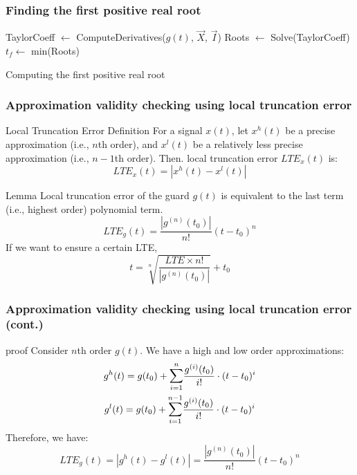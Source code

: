 \begin{frame}[c] \frametitle{ Finding the first positive real root }
	\begin{algorithm}[H]
	\SetAlgoLined
	TaylorCoeff $\leftarrow$ ComputeDerivatives($g(t)$, $\vec{X}$, $\vec{I}$)\;
	Roots $\leftarrow$ Solve(TaylorCoeff)\;
	$t_f \leftarrow $ min(Roots)\;
	\caption{Computing the first positive real root}
	\end{algorithm}
\end{frame}


\begin{frame}[c] \frametitle{ Approximation validity checking using local truncation error }
	\begin{block}{Local Truncation Error Definition}
		For a signal $x(t)$, let $x^h(t)$ be a precise approximation (i.e., $n$th order), and $x^l(t)$ be a relatively less precise approximation (i.e., $n-1$th order). Then. local truncation error $LTE_x(t)$ is:
		\begin{equation}
			LTE_x(t) = | x^h(t) - x^l(t) |
		\end{equation}
	\end{block}
	\begin{block}{Lemma}
		Local truncation error of the guard $g(t)$ is equivalent to the last term (i.e., highest order) polynomial term. 
		\begin{equation}
			LTE_g(t) = \dfrac{| g^{(n)}(t_0) |}{n!}(t-t_0)^n
		\end{equation}
		If we want to ensure a certain LTE,
		\begin{equation}
			t = \sqrt[n]{\dfrac{LTE \times n!}{ |g^{(n)}(t_0)|}} + t_0
		\end{equation}
	\end{block}
\end{frame}

\begin{frame}[c] \frametitle{ Approximation validity checking using local truncation error (cont.) }
	\begin{block}{proof}
		Consider $n$th order $g(t)$. We have a high and low order approximations: 
		\begin{gather}
			g^h(t) = g(t_0) + \mathlarger{\sum}_{i=1}^{n} \dfrac{g^{(i)}(t_0)}{i!} \cdot (t - t_0)^i \\
			g^l(t) = g(t_0) + \mathlarger{\sum}_{i=1}^{n-1} \dfrac{g^{(i)}(t_0)}{i!} \cdot (t - t_0)^i 	\\			
		\end{gather}
		Therefore, we have:
		\begin{equation}
			LTE_g(t) = | g^h(t) - g^l(t) | = \dfrac{ | g^{(n)}(t_0)|}{n!}(t-t_0)^n		
		\end{equation}
	\end{block}
\end{frame}

